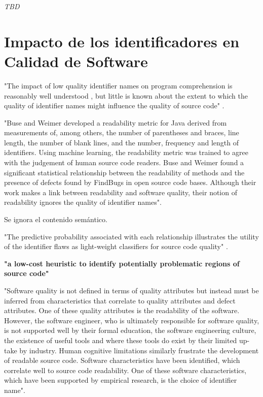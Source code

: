 \textit{TBD}

\section{Impacto de los identificadores en Calidad de Software}

"The impact of low quality identifier names on program comprehension is reasonably
well understood \cite{DeiBenbockPizka05,Lawrie2007,Lawrie2006}, but little is known
about the extent to which the quality of identifier names might influence the quality
of source code" \cite{ButlerWemelingerYu10}.

"Buse and Weimer \cite{Buse2008} developed a readability metric for Java derived from measurements 
of, among others, the number of parentheses and braces, line length, the number
of blank lines, and the number, frequency and length of identifiers.
Using machine learning, the readability metric was trained to agree with the judgement 
of human source code readers.
Buse and Weimer found a significant statistical relationship between the readability of 
methods and the presence of defects found by FindBugs in open source code bases. 
Although their work makes a link between readability and software quality, their notion
of readability ignores the quality of identifier names".

Se ignora el contenido semántico.

"The predictive probability associated with each relationship illustrates the utility
of the identifier flaws as light-weight classifiers for source code quality"
\cite{ButlerWemelingerYu10}.

\textbf{"a low-cost heuristic to identify potentially problematic regions of source code"}

"Software quality is not defined in terms of quality attributes but instead must be
inferred from characteristics that correlate to quality attributes and defect attributes.
One of these quality attributes is the readability of the software.
However, the software engineer, who is ultimately responsible for software quality,
is not supported well by their formal education, the software engineering culture, the
existence of useful tools and where these tools do exist by their limited up-take by industry.
Human cognitive limitations similarly frustrate the development of readable source code.
Software characteristics have been identified, which correlate well to source code readability.
One of these software characteristics, which have been supported by empirical research,
is the choice of identifier name".\cite{Relf04}

